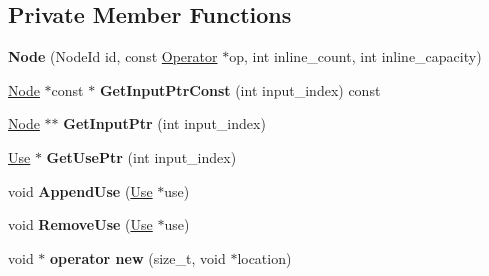 \subsection*{Private Member Functions}
\begin{DoxyCompactItemize}
\item 
{\bfseries Node} (Node\+Id id, const \hyperlink{classv8_1_1internal_1_1compiler_1_1_operator}{Operator} $\ast$op, int inline\+\_\+count, int inline\+\_\+capacity)\hypertarget{classv8_1_1internal_1_1compiler_1_1_node_a7df220d1e9e8ecd73715c40849e0ab24}{}\label{classv8_1_1internal_1_1compiler_1_1_node_a7df220d1e9e8ecd73715c40849e0ab24}

\item 
\hyperlink{classv8_1_1internal_1_1compiler_1_1_node}{Node} $\ast$const $\ast$ {\bfseries Get\+Input\+Ptr\+Const} (int input\+\_\+index) const \hypertarget{classv8_1_1internal_1_1compiler_1_1_node_a7f3b48c4e44ff90751acb060cd4b734b}{}\label{classv8_1_1internal_1_1compiler_1_1_node_a7f3b48c4e44ff90751acb060cd4b734b}

\item 
\hyperlink{classv8_1_1internal_1_1compiler_1_1_node}{Node} $\ast$$\ast$ {\bfseries Get\+Input\+Ptr} (int input\+\_\+index)\hypertarget{classv8_1_1internal_1_1compiler_1_1_node_a2ff081d16977d3dd12a863247c19aa73}{}\label{classv8_1_1internal_1_1compiler_1_1_node_a2ff081d16977d3dd12a863247c19aa73}

\item 
\hyperlink{structv8_1_1internal_1_1compiler_1_1_node_1_1_use}{Use} $\ast$ {\bfseries Get\+Use\+Ptr} (int input\+\_\+index)\hypertarget{classv8_1_1internal_1_1compiler_1_1_node_a0023bb149f217dcc412acce05db58bb3}{}\label{classv8_1_1internal_1_1compiler_1_1_node_a0023bb149f217dcc412acce05db58bb3}

\item 
void {\bfseries Append\+Use} (\hyperlink{structv8_1_1internal_1_1compiler_1_1_node_1_1_use}{Use} $\ast$use)\hypertarget{classv8_1_1internal_1_1compiler_1_1_node_a4b99fb1480bdd46b987ecd63e78cc6cb}{}\label{classv8_1_1internal_1_1compiler_1_1_node_a4b99fb1480bdd46b987ecd63e78cc6cb}

\item 
void {\bfseries Remove\+Use} (\hyperlink{structv8_1_1internal_1_1compiler_1_1_node_1_1_use}{Use} $\ast$use)\hypertarget{classv8_1_1internal_1_1compiler_1_1_node_a940f2224a3013f6d41a1d1ad957c6d14}{}\label{classv8_1_1internal_1_1compiler_1_1_node_a940f2224a3013f6d41a1d1ad957c6d14}

\item 
void $\ast$ {\bfseries operator new} (size\+\_\+t, void $\ast$location)\hypertarget{classv8_1_1internal_1_1compiler_1_1_node_af67ec01e627c01929f12fe07edc48f4f}{}\label{classv8_1_1internal_1_1compiler_1_1_node_af67ec01e627c01929f12fe07edc48f4f}


\end{DoxyCompactItemize}
